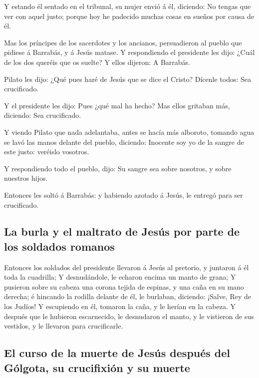  Y estando él sentado en el tribunal, su mujer envió á
él, diciendo: No tengas que ver con aquel justo; porque hoy he padecido
muchas cosas en sueños por causa de él.

 Mas los príncipes de los sacerdotes y los ancianos,
persuadieron al pueblo que pidiese á Barrabás, y á Jesús matase.
 Y respondiendo el presidente les dijo: ¿Cuál de los dos
queréis que os suelte? Y ellos dijeron: A Barrabás.

 Pilato les dijo: ¿Qué pues haré de Jesús que se dice el
Cristo? Dícenle todos: Sea crucificado.

 Y el presidente les dijo: Pues ¿qué mal ha hecho? Mas
ellos gritaban más, diciendo: Sea crucificado.

 Y viendo Pilato que nada adelantaba, antes se hacía más
alboroto, tomando agua se lavó las manos delante del pueblo, diciendo:
Inocente soy yo de la sangre de este justo: veréislo vosotros.

 Y respondiendo todo el pueblo, dijo: Su sangre sea sobre
nosotros, y sobre nuestros hijos.

 Entonces les soltó á Barrabás: y habiendo azotado á
Jesús, le entregó para ser crucificado.

\hypertarget{la-burla-y-el-maltrato-de-jesuxfas-por-parte-de-los-soldados-romanos}{%
\subsection{La burla y el maltrato de Jesús por parte de los soldados
romanos}\label{la-burla-y-el-maltrato-de-jesuxfas-por-parte-de-los-soldados-romanos}}

 Entonces los soldados del presidente llevaron á Jesús al
pretorio, y juntaron á él toda la cuadrilla;  Y
desnudándole, le echaron encima un manto de grana;  Y
pusieron sobre su cabeza una corona tejida de espinas, y una caña en su
mano derecha; é hincando la rodilla delante de él, le burlaban,
diciendo: ¡Salve, Rey de los Judíos!  Y escupiendo en él,
tomaron la caña, y le herían en la cabeza.  Y después que
le hubieron escarnecido, le desnudaron el manto, y le vistieron de sus
vestidos, y le llevaron para crucificarle.

\hypertarget{el-curso-de-la-muerte-de-jesuxfas-despuuxe9s-del-guxf3lgota-su-crucifixiuxf3n-y-su-muerte}{%
\subsection{El curso de la muerte de Jesús después del Gólgota, su
crucifixión y su
muerte}\label{el-curso-de-la-muerte-de-jesuxfas-despuuxe9s-del-guxf3lgota-su-crucifixiuxf3n-y-su-muerte}}


